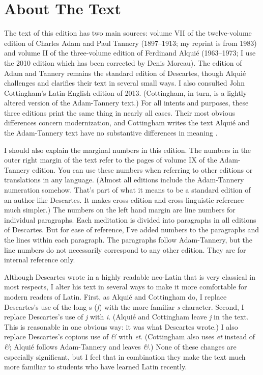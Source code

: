 \section*{About The Text}

The text of this edition has two main sources: volume VII of the twelve-volume edition of Charles Adam and Paul Tannery (1897--1913; my reprint is from 1983) and volume II of the three-volume edition of Ferdinand Alquié (1963--1973; I use the 2010 edition which has been corrected by Denis Moreau). The edition of Adam and Tannery remains the standard edition of Descartes, though Alquié challenges and clarifies their text in several small ways. I also consulted John Cottingham's Latin-English edition of 2013. (Cottingham, in turn, is a lightly altered version of the Adam-Tannery text.) For all intents and purposes, these three editions print the same thing in nearly all cases. Their most obvious differences concern modernization, and Cottingham writes the text Alquié and the Adam-Tannery text have no substantive differences in meaning \cite[xxxii, footnote 5]{cottingham2013}.

I should also explain the marginal numbers in this edition. The numbers in the outer right margin of the text refer to the pages of volume IX of the Adam-Tannery edition. You can use these numbers when referring to other editions or translations in any language. (Almost all editions include the Adam-Tannery numeration somehow. That's part of what it means to be a standard edition of an author like Descartes. It makes cross-edition and cross-linguistic reference much simpler.) The numbers on the left hand margin are line numbers for individual paragraphs. Each meditation is divided into paragraphs in all editions of Descartes. But for ease of reference, I've added numbers to the paragraphs and the lines within each paragraph. The paragraphs follow Adam-Tannery, but the line numbers do not necessarily correspond to any other edition. They are for internal reference only.

Although Descartes wrote in a highly readable neo-Latin that is very classical in most respects, I alter his text in several ways to make it more comfortable for modern readers of Latin. First, as Alquié and Cottingham do, I replace Descartes's use of the long s (\textit{ſ}) with the more familiar \textit{s} character. Second, I replace Descartes's use of \textit{j} with \textit{i}. (Alquié and Cottingham leave \textit{j} in the text. This is reasonable in one obvious way: it was what Descartes wrote.) I also replace Descartes's copious use of \textit{\&} with \textit{et}. (Cottingham also uses \textit{et} instead of \textit{\&}; Alquié follows Adam-Tannery and leaves \textit{\&}.) None of these changes are especially significant, but I feel that in combination they make the text much more familiar to students who have learned Latin recently.

